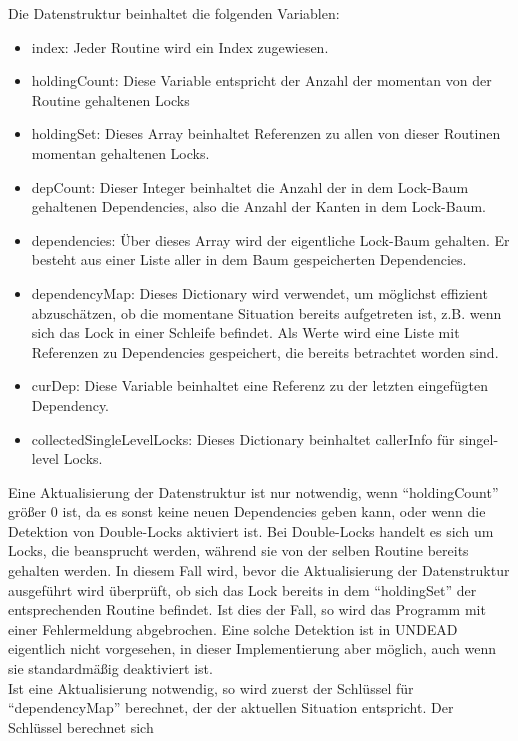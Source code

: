 Die Datenstruktur beinhaltet die folgenden Variablen:
\begin{itemize}
    \item index: Jeder Routine wird ein Index zugewiesen.
    \item holdingCount: Diese Variable entspricht der Anzahl der momentan von der 
        Routine gehaltenen Locks
    \item holdingSet: Dieses Array beinhaltet Referenzen zu allen von dieser 
        Routinen momentan gehaltenen Locks.
    \item depCount: Dieser Integer beinhaltet die Anzahl der in dem Lock-Baum 
        gehaltenen Dependencies, also die Anzahl der Kanten in dem Lock-Baum.
    \item dependencies: Über dieses Array wird der eigentliche Lock-Baum 
        gehalten. Er besteht aus einer Liste aller in dem Baum gespeicherten 
        Dependencies.
    \item dependencyMap: Dieses Dictionary wird verwendet, um möglichst 
        effizient abzuschätzen, ob die momentane Situation bereits aufgetreten 
        ist, z.B. wenn sich das Lock in einer Schleife befindet. Als Werte wird
        eine Liste mit Referenzen zu Dependencies gespeichert, die bereits 
        betrachtet worden sind.
    \item curDep: Diese Variable beinhaltet eine Referenz zu der letzten 
        eingefügten Dependency.
    \item collectedSingleLevelLocks: Dieses Dictionary beinhaltet callerInfo für 
        singel-level Locks.
\end{itemize}
Eine Aktualisierung der Datenstruktur ist nur notwendig, wenn ``holdingCount'' 
größer 0 ist, da es sonst keine neuen Dependencies geben kann, oder wenn die 
Detektion von Double-Locks aktiviert ist. Bei Double-Locks handelt es sich 
um Locks, die beansprucht werden, während sie von der selben Routine 
bereits gehalten werden. In diesem Fall wird, bevor die Aktualisierung der 
Datenstruktur ausgeführt wird überprüft, ob sich das Lock bereits in dem
``holdingSet'' der entsprechenden Routine befindet. Ist dies der Fall, so wird 
das Programm mit einer Fehlermeldung abgebrochen. Eine solche Detektion ist in 
UNDEAD eigentlich nicht 
vorgesehen, in dieser Implementierung aber möglich, auch wenn sie standardmäßig 
deaktiviert ist.\\ Ist eine 
Aktualisierung notwendig, so wird zuerst der Schlüssel für ``dependencyMap''
berechnet, der der aktuellen Situation entspricht. Der Schlüssel berechnet sich 
